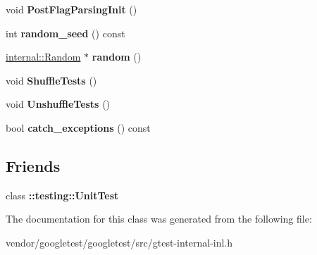 \begin{DoxyCompactItemize}
\item 
void {\bfseries Post\+Flag\+Parsing\+Init} ()\hypertarget{classtesting_1_1internal_1_1UnitTestImpl_a772894193104b1b2516f16e6ff813168}{}\label{classtesting_1_1internal_1_1UnitTestImpl_a772894193104b1b2516f16e6ff813168}

\item 
int {\bfseries random\+\_\+seed} () const \hypertarget{classtesting_1_1internal_1_1UnitTestImpl_a8ec59a7ab3bad96bccde98ce85ffc864}{}\label{classtesting_1_1internal_1_1UnitTestImpl_a8ec59a7ab3bad96bccde98ce85ffc864}

\item 
\hyperlink{classtesting_1_1internal_1_1Random}{internal\+::\+Random} $\ast$ {\bfseries random} ()\hypertarget{classtesting_1_1internal_1_1UnitTestImpl_ab3b45b5eb4d583219a3602011ea44347}{}\label{classtesting_1_1internal_1_1UnitTestImpl_ab3b45b5eb4d583219a3602011ea44347}

\item 
void {\bfseries Shuffle\+Tests} ()\hypertarget{classtesting_1_1internal_1_1UnitTestImpl_aaaa38e6a4372e6bb9bbe3143a3a32b65}{}\label{classtesting_1_1internal_1_1UnitTestImpl_aaaa38e6a4372e6bb9bbe3143a3a32b65}

\item 
void {\bfseries Unshuffle\+Tests} ()\hypertarget{classtesting_1_1internal_1_1UnitTestImpl_a1ee7db3bf8284dd9dce4dc857564bce3}{}\label{classtesting_1_1internal_1_1UnitTestImpl_a1ee7db3bf8284dd9dce4dc857564bce3}

\item 
bool {\bfseries catch\+\_\+exceptions} () const \hypertarget{classtesting_1_1internal_1_1UnitTestImpl_a0bbc6e237776ee6afaee106fe83e0406}{}\label{classtesting_1_1internal_1_1UnitTestImpl_a0bbc6e237776ee6afaee106fe83e0406}

\end{DoxyCompactItemize}
\subsection*{Friends}
\begin{DoxyCompactItemize}
\item 
class {\bfseries \+::testing\+::\+Unit\+Test}\hypertarget{classtesting_1_1internal_1_1UnitTestImpl_a893404438388dec058dc5c02e8f9a014}{}\label{classtesting_1_1internal_1_1UnitTestImpl_a893404438388dec058dc5c02e8f9a014}

\end{DoxyCompactItemize}


The documentation for this class was generated from the following file\+:\begin{DoxyCompactItemize}
\item 
vendor/googletest/googletest/src/gtest-\/internal-\/inl.\+h\end{DoxyCompactItemize}
